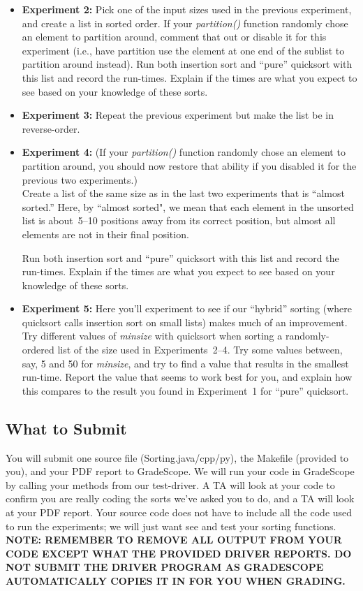 \documentclass[11pt]{article}
\begin{document}
\begin{itemize}
\item {\bf Experiment 2:} Pick one of the input sizes used in the previous experiment, and create a list in sorted order. If your {\em partition()\/} function randomly chose an element to partition around, comment that out or disable it for this experiment (i.e., have partition use the element at one end of the sublist to partition around instead). Run both insertion sort and ``pure'' quicksort with this list and record the run-times. Explain if the times are what you expect to see based on your knowledge of these sorts.

\item {\bf Experiment 3:} Repeat the previous experiment but make the list be in reverse-order.

\item {\bf Experiment 4:} (If your {\em partition()\/} function randomly chose an element to partition around, you should now restore that ability if you disabled it for the previous two experiments.) \\
Create a list of the same size as in the last two experiments that is ``almost sorted.'' Here, by ``almost
sorted", we mean that each element in the unsorted list is about~5--10 positions away
from its correct position, but almost all elements are not in their final position.

Run both insertion sort and ``pure'' quicksort with this list and record the run-times. Explain if the times are what you expect to see based on your knowledge of these sorts.

\item {\bf Experiment 5:} Here you'll experiment to see if our ``hybrid'' sorting (where  quicksort calls insertion sort on small lists) makes much of an improvement.  Try different values of {\em minsize}  with quicksort when sorting  a randomly-ordered list of the size used in Experiments~2--4.   Try some values between, say, 5 and 50 for  {\em minsize}, and try to find a value that results in the smallest run-time.  Report the value that seems to work best for you, and explain how this compares to the result you found in Experiment~1 for ``pure'' quicksort.

\end{itemize}

\subsection*{What to Submit}

You will submit one source file (Sorting.java/cpp/py), the Makefile (provided to you), and your PDF report to GradeScope. We will run your code in GradeScope by calling your methods from our test-driver.  A TA will look at your code to confirm you are really coding the sorts we've asked you to do, and a TA will look at your PDF report.  Your source code does not have to include all the code used to run the experiments; we will just want see and test your sorting functions. \textbf{NOTE: REMEMBER TO REMOVE ALL OUTPUT FROM YOUR CODE EXCEPT WHAT THE PROVIDED DRIVER REPORTS. DO NOT SUBMIT THE DRIVER PROGRAM AS GRADESCOPE AUTOMATICALLY COPIES IT IN FOR YOU WHEN GRADING.}
\end{document}
